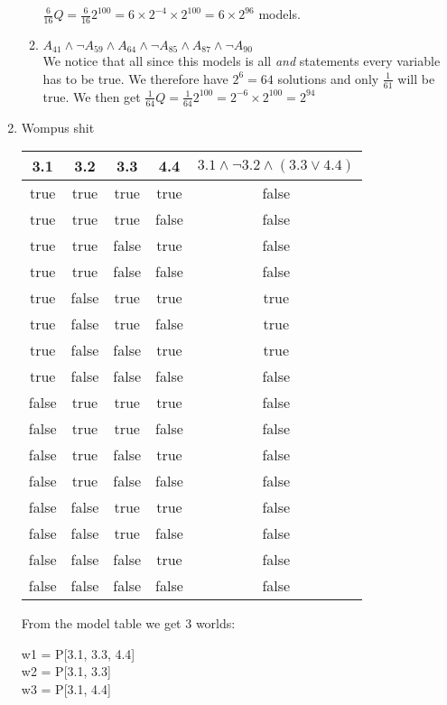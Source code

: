 \documentclass[paper=a4, fontsize=11pt]{scrartcl} %
\numberwithin{equation}{section} %
\numberwithin{figure}{section} %
\numberwithin{table}{section} %
\begin{document}
\begin{enumerate}
\begin{enumerate}
		$\frac{6}{16}Q = \frac{6}{16}2^{100} = 6 \times 2^{-4} \times 2^{100} = 6 \times 2^{96}$ models. \\
		
		\item %
		$A_{41} \wedge \neg A_{59} \wedge A_{64} \wedge \neg A_{85} \wedge A_{87} \wedge \neg A_{90}$
		\\
		
		We notice that all since this models is all \textit{and} statements every variable has to be true. We therefore have $2^{6} = 64$ solutions and only $\frac{1}{61}$ will be true.
		We then get $\frac{1}{64}Q = \frac{1}{64}2^{100} = 2^{-6} \times 2^{100} = 2^{94}$
	\end{enumerate}
	\item 
	Wompus shit \\
	\begin{tabular}{c c c c c}
		\hline
		3.1 & 3.2 & 3.3 & 4.4 & $3.1 \wedge \neg 3.2 \wedge (3.3 \vee 4.4)$ \\
		\hline
		true 	& true 		& true 		& true		& false\\
		true 	& true 		& true 		& false		& false\\
		true 	& true 		& false 	& true		& false\\
		true 	& true 		& false 	& false		& false\\
		true 	& false 	& true 		& true		& true\\
		true 	& false 	& true 		& false		& true\\
		true 	& false 	& false 	& true		& true\\
		true 	& false 	& false 	& false		& false\\
		false 	& true 		& true 		& true		& false\\
		false 	& true 		& true 		& false		& false\\
		false 	& true 		& false 	& true		& false\\
		false 	& true 		& false 	& false		& false\\
		false 	& false 	& true 		& true		& false\\
		false 	& false 	& true 		& false		& false\\
		false 	& false 	& false 	& true		& false\\
		false 	& false 	& false 	& false		& false\\
	\end{tabular}

	From the model table we get 3 worlds:

	w1 = P[3.1, 3.3, 4.4]\\
	w2 = P[3.1, 3.3]\\
	w3 = P[3.1, 4.4]\\


\end{enumerate}
\end{document}
